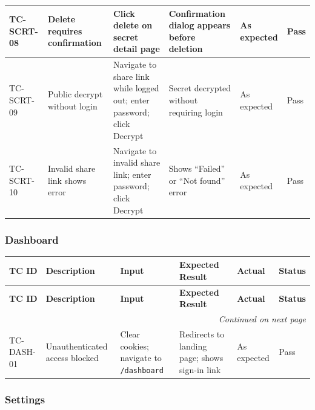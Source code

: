 \documentclass[12pt,a4paper]{article}
\begin{document}
{\begin{longtable}{@{}p{1.4cm}p{2.6cm}p{3.3cm}p{3.8cm}p{1.4cm}p{0.8cm}@{}}
  TC-SCRT-08 &
  Delete requires confirmation &
  Click delete on secret detail page &
  Confirmation dialog appears before deletion &
  As expected &
  Pass \\
  \hline

  TC-SCRT-09 &
  Public decrypt without login &
  Navigate to share link while logged out; enter password; click Decrypt &
  Secret decrypted without requiring login &
  As expected &
  Pass \\
  \hline

  TC-SCRT-10 &
  Invalid share link shows error &
  Navigate to invalid share link; enter password; click Decrypt &
  Shows ``Failed'' or ``Not found'' error &
  As expected &
  Pass \\
\end{longtable}
}

\subsubsection{Dashboard}

{\footnotesize
\begin{longtable}{@{}p{1.4cm}p{2.6cm}p{3.3cm}p{3.8cm}p{1.4cm}p{0.8cm}@{}}
  \toprule
  \textbf{TC ID} & \textbf{Description} & \textbf{Input} & \textbf{Expected Result} & \textbf{Actual} & \textbf{Status} \\
  \midrule
  \endfirsthead
  \toprule
  \textbf{TC ID} & \textbf{Description} & \textbf{Input} & \textbf{Expected Result} & \textbf{Actual} & \textbf{Status} \\
  \midrule
  \endhead
  \hline
  \multicolumn{6}{r}{\textit{Continued on next page}} \\
  \endfoot
  \bottomrule
  \endlastfoot

  TC-DASH-01 &
  Unauthenticated access blocked &
  Clear cookies; navigate to \texttt{/dashboard} &
  Redirects to landing page; shows sign-in link &
  As expected &
  Pass \\
\end{longtable}
}

\subsubsection{Settings}
\end{document}
